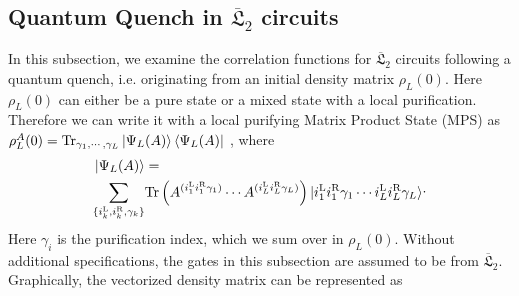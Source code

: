 \documentclass[aps,prx,twocolumn,notitlepage,nofootinbib,nobalancelastpage]{revtex4-2}
\theoremstyle{break}
\newcommand{\1}{\mathbbm{1}}
\theoremstyle{plain}
\theoremstyle{plain}
\theoremstyle{plain}
\newcommand{\pk}[1]{{\color{blue}[#1]}}
\begin{document}
\subsection{Quantum Quench in $\overline{\mathfrak{L}}_2$ circuits}
\label{Quantum_quench}


In this subsection, we examine the correlation functions for $\overline{\mathfrak{L}}_2$ circuits following a quantum quench, i.e. originating from an initial density matrix $\rho_L(0)$. Here $\rho_L(0)$ can either be a pure state or a mixed state with a local purification.
Therefore we can write it with a local purifying Matrix Product State (MPS) as $\rho_{L}^A(0)=\mathrm{Tr}_{\gamma_{1},\cdots,\gamma_{L}}\ket{\Psi_{L}(A)}\bra{\Psi_{L}(A)}$ 
\cite{kos2023circuits,piroli2020exact}, where
\begin{equation}
\begin{aligned}\ket{\Psi_{L}(A)} & =\\
\sum_{\{i_{k}^{\mathrm{L}},i_{k}^{\mathrm{R}},\gamma_{k}\}} & \mathrm{Tr}\left(A^{(i_{1}^{\mathrm{L}}i_{1}^{\mathrm{R}}\gamma_{1})}\cdots A^{(i_{L}^{\mathrm{L}}i_{L}^{\mathrm{R}}\gamma_{L})}\right)\ket{i_{1}^{\mathrm{L}}i_{1}^{\mathrm{R}}\gamma_{1}\cdots i_{L}^{\mathrm{L}}i_{L}^{\mathrm{R}}\gamma_{L}}
\end{aligned}.
\end{equation}
Here $\gamma_i$ is the purification  index, which we sum over in $\rho_L(0)$.
Without additional specifications, the gates in this subsection are assumed to be from $\overline{\mathfrak{L}}_2$. %
 Graphically, the vectorized density matrix can be represented as 
\end{document}
